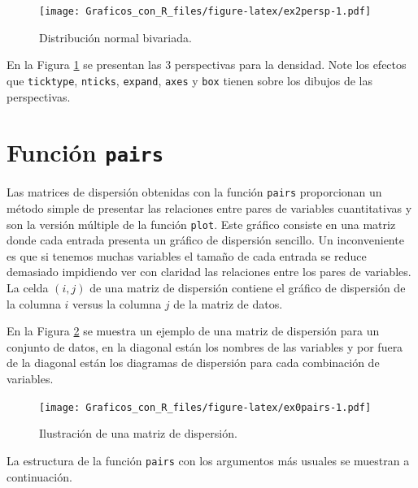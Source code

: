 \documentclass[10pt,]{krantz}
\begin{document}
\begin{figure}[htbp]
\centering
\texttt{[image: Graficos\_con\_R\_files/figure-latex/ex2persp-1.pdf]}
\caption{\label{fig:ex2persp}Distribución normal bivariada.}
\end{figure}

En la Figura \ref{fig:ex2persp} se presentan las 3 perspectivas para la
densidad. Note los efectos que \texttt{ticktype}, \texttt{nticks},
\texttt{expand}, \texttt{axes} y \texttt{box} tienen sobre los dibujos
de las perspectivas.

\section{\texorpdfstring{Función \texttt{pairs}
}{Función pairs }}\label{funcion-pairs}

Las matrices de dispersión obtenidas con la función \texttt{pairs}
proporcionan un método simple de presentar las relaciones entre pares de
variables cuantitativas y son la versión múltiple de la función
\texttt{plot}. Este gráfico consiste en una matriz donde cada entrada
presenta un gráfico de dispersión sencillo. Un inconveniente es que si
tenemos muchas variables el tamaño de cada entrada se reduce demasiado
impidiendo ver con claridad las relaciones entre los pares de variables.
La celda \((i,j)\) de una matriz de dispersión contiene el gráfico de
dispersión de la columna \(i\) versus la columna \(j\) de la matriz de
datos.

En la Figura \ref{fig:ex0pairs} se muestra un ejemplo de una matriz de
dispersión para un conjunto de datos, en la diagonal están los nombres
de las variables y por fuera de la diagonal están los diagramas de
dispersión para cada combinación de variables.

\begin{figure}[htbp]
\centering
\texttt{[image: Graficos\_con\_R\_files/figure-latex/ex0pairs-1.pdf]}
\caption{\label{fig:ex0pairs}Ilustración de una matriz de dispersión.}
\end{figure}

La estructura de la función \texttt{pairs} con los argumentos más
usuales se muestran a continuación.
\end{document}
